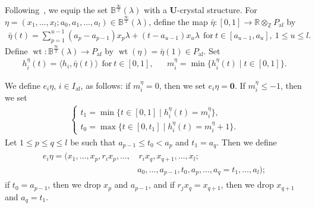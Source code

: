 \documentclass[ALCO,ThmDefs,Unicode,epreuves]{cedram}
\newcommand{\BR}{\mathbb{R}}
\newcommand{\BZ}{\mathbb{Z}}
\newcommand\bm[1]{\boldsymbol{#1}}
\renewcommand{\U}{\mathbf{U}}
\newcommand{\si}{\frac{\infty}{2}}
\DeclareMathOperator{\af}{af}
\DeclareMathOperator{\wt}{wt}
\begin{document}
Following~\cite[\S~3.1]{INS16}, 
we equip the set 
$\mathbb{B}^{\si}(\lambda)$ 
with a $\U$-crystal structure.
For 
$\eta = (x_1 , \ldots , x_l ; a_0 , a_1 , \ldots , a_l) \in \mathbb{B}^{\si}(\lambda)$, 
define the map 
$\bar{\eta} : [0,1] \rightarrow \BR \otimes_{\BZ} P_{\af}$ 
by
\begin{align} \label{eq:path}
\bar{\eta}(t) 
=
\sum_{p=1}^{u-1} (a_p - a_{p-1}) x_p \lambda + (t - a_{u-1}) x_u \lambda 
\ \ 
\text{for} \ 
t \in [a_{u-1} , a_u], \ 
1 \leq u \leq l.
\end{align}
Define 
$\wt : \mathbb{B}^{\si}(\lambda) \rightarrow P_{\af}$
by
$\wt (\eta) = \bar{\eta}(1) \in P_{\af}$.
Set
\begin{align} \label{eq:path-h-m}
h_i^{\eta}(t) 
= 
\langle h_i , \bar{\eta}(t) \rangle 
\ \ \text{for}\ 
t \in [0,1] , &&
m_i^{\eta} 
= 
\min \{ h_i^{\eta}(t) \mid t \in [0,1] \} .
\end{align}

We define 
$e_i \eta$, $i \in I_{\af}$, 
as follows: 
if $m_i^{\eta} = 0$, 
then we set $e_i \eta = \bm{0}$.
If $m_i^{\eta} \leq -1$, then we set
\begin{align} \label{eq:e_i-t}
\begin{cases}
t_1 = \min \{ t \in [0,1] \mid h_i^{\eta}(t) = m_i^{\eta} \} , \\%
t_0 = \max \{ t \in [0,t_1] \mid h_i^{\eta}(t) = m_i^{\eta} + 1 \} .
\end{cases}
\end{align}
Let 
$1 \leq p \leq q \leq l$
be such that 
$a_{p-1} \leq t_0 < a_p$ and $t_1 = a_q$. 
Then we define 
\begin{align} \label{eq:e_i}
\begin{split}
e_i \eta 
= 
(x_1 , \ldots , x_p , r_i x_p , \ldots , 
&\, r_i x_q , x_{q+1} , \ldots , x_l ; \\
&a_0 , \ldots , a_{p-1} , t_0 , a_p , \ldots , a_q = t_1 , \ldots , a_l ) ;
\end{split}
\end{align}
if $t_0 = a_{p-1}$, 
then we drop $x_p$ and $a_{p-1}$, 
and if $r_j x_q = x_{q+1}$, 
then we drop $x_{q+1}$ and $a_q = t_1$.
\end{document}
